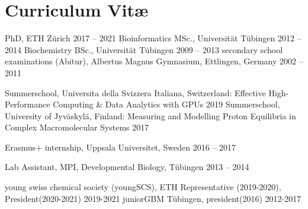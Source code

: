 \chapter{Curriculum Vit\ae}
\vspace{-1cm}
\begin{cvlist}
\end{cvlist}

\begin{cvlist}
\cventry
    {PhD, ETH Z\"{u}rich } %
    {2017 -- 2021} %
\cventry
    {Bioinformatics MSc., Universit\"{a}t T\"{u}bingen} %
    {2012 -- 2014} %
\cventry
    {Biochemistry BSc., Universit\"{a}t T\"{u}bingen} %
    {2009 -- 2013} %
\cventry
    {secondary school examinations (Abitur), Albertus Magnus Gymnasium, Ettlingen, Germany} %
    {2002 -- 2011} 
\end{cvlist}
\vspace{-0.5cm}
\begin{cvlist}
	\cventry
	{Summerschool,  Universita della Svizzera Italiana, Switzerland: Effective High-Performance Computing \& Data Analytics with GPUs} %
	{2019} %
	\cventry
	{Summerschool,  University of Jyväskylä, Finland: Measuring and Modelling Proton Equilibria in Complex Macromolecular Systems} %
	{2017} %
	
	\cventry
	{Erasmus+ internship, Uppsala Universitet, Sweden} %
	{2016 -- 2017} %
	
	\cventry
    {Lab Assistant, MPI, Developmental Biology, T\"{u}bingen} %
    {2013 -- 2014} %
\end{cvlist}
\vspace{-0.75cm}
\vspace{-0.75cm}
\begin{cvlist}
	\cventry
	{young swiss chemical society (youngSCS), ETH Representative (2019-2020), President(2020-2021)} %
	{2019-2021} %
	\cventry
	{juniorGBM T\"ubingen, president(2016)} %
	{2012-2017} %
	
\end{cvlist}
